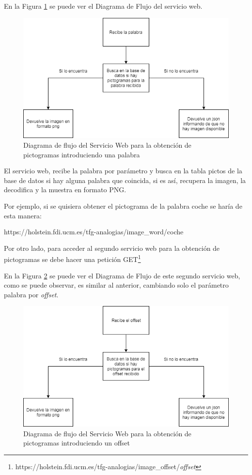 En la Figura \ref{fig:swpictos_palabra} se puede ver el Diagrama de Flujo del servicio web.
\begin{figure}[!h]
	\includegraphics[width=.9\textwidth]{Imagenes/Bitmap/Capitulo4/ServiciosWeb/pictoPalabra.png}
	\centering
	\caption{Diagrama de flujo del Servicio Web para la obtención de pictogramas introduciendo una palabra}
	\label{fig:swpictos_palabra}
\end{figure}

El servicio web, recibe la palabra por parámetro y busca en la tabla pictos de la base de datos si hay alguna palabra que coincida, si es así, recupera la imagen, la decodifica y la muestra en formato PNG.

Por ejemplo, si se quisiera obtener el pictograma de la palabra coche se haría de esta manera:

https://holstein.fdi.ucm.es/tfg-analogias/image\_word/coche


Por otro lado, para acceder al segundo servicio web para la obtención de pictogramas se debe hacer una petición GET\footnote{https://holstein.fdi.ucm.es/tfg-analogias/image\_offset/\textit{offset}} 



En la Figura \ref{fig:swpictos_offset} se puede ver el Diagrama de Flujo de este segundo servicio web, como se puede observar, es similar al anterior, cambiando solo el parámetro palabra por \textit{offset}.

\begin{figure}[!h]
	\includegraphics[width=.9\textwidth]{Imagenes/Bitmap/Capitulo4/ServiciosWeb/pictoOffset.png}
	\centering
	\caption{Diagrama de flujo del Servicio Web para la obtención de pictogramas introduciendo un offset}
	\label{fig:swpictos_offset}
\end{figure}


